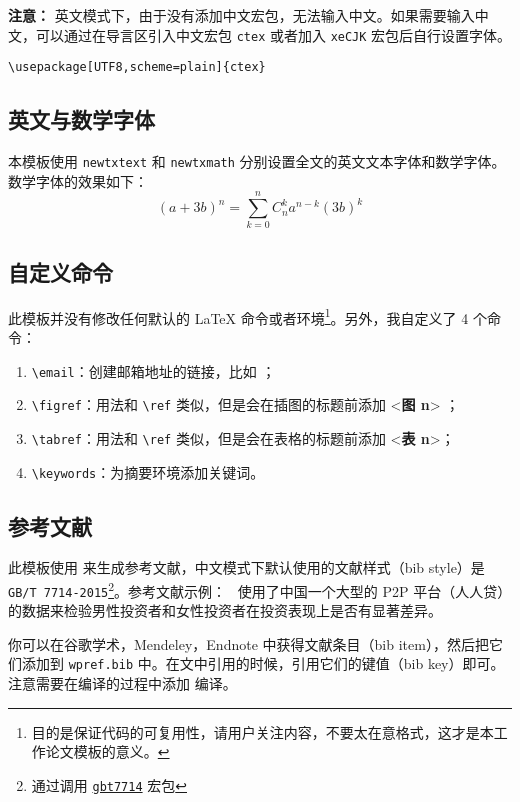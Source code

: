 \documentclass[lang=cn,11pt,authoryear,a4paper]{elegantpaper}
\begin{document}
\textbf{注意：} 英文模式下，由于没有添加中文宏包，无法输入中文。如果需要输入中文，可以通过在导言区引入中文宏包 \lstinline{ctex} 或者加入 \lstinline{xeCJK} 宏包后自行设置字体。 
\begin{lstlisting}
\usepackage[UTF8,scheme=plain]{ctex}
\end{lstlisting}

\subsection{英文与数学字体}

本模板使用 \lstinline{newtxtext} 和 \lstinline{newtxmath} 分别设置全文的英文文本字体和数学字体。数学字体的效果如下：
\begin{equation}
(a+3b)^{n} = \sum_{k=0}^{n} C_{n}^{k} a^{n-k} (3b)^k\label{eq:binom}
\end{equation}

\subsection{自定义命令}
此模板并没有修改任何默认的 \LaTeX{} 命令或者环境\footnote{目的是保证代码的可复用性，请用户关注内容，不要太在意格式，这才是本工作论文模板的意义。}。另外，我自定义了 4 个命令：
\begin{enumerate}
  \item \lstinline{\email}：创建邮箱地址的链接，比如 ；
  \item \lstinline{\figref}：用法和 \lstinline{\ref} 类似，但是会在插图的标题前添加 <\textbf{图 n}> ；
  \item \lstinline{\tabref}：用法和 \lstinline{\ref} 类似，但是会在表格的标题前添加 <\textbf{表 n}>；
  \item \lstinline{\keywords}：为摘要环境添加关键词。
\end{enumerate}

\subsection{参考文献}
此模板使用  来生成参考文献，中文模式下默认使用的文献样式（bib style）是 \lstinline{GB/T 7714-2015}\footnote{通过调用 \href{https://ctan.org/pkg/gbt7714}{\lstinline{gbt7714}} 宏包}。参考文献示例：~\cite{en3} 使用了中国一个大型的 P2P 平台（人人贷）的数据来检验男性投资者和女性投资者在投资表现上是否有显著差异。

你可以在谷歌学术，Mendeley，Endnote 中获得文献条目（bib item），然后把它们添加到 \lstinline{wpref.bib} 中。在文中引用的时候，引用它们的键值（bib key）即可。注意需要在编译的过程中添加  编译。
\end{document}
